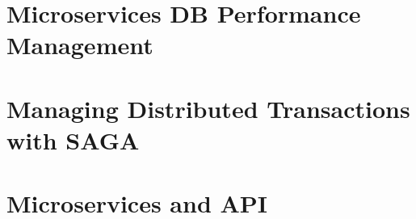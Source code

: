 \documentclass[a4paper, 11pt]{book}
\begin{document}
    \chapter{Microservices DB Performance Management}
    

    \chapter{Managing Distributed Transactions with SAGA}
    

    \chapter{Microservices and API}
    
\end{document}
